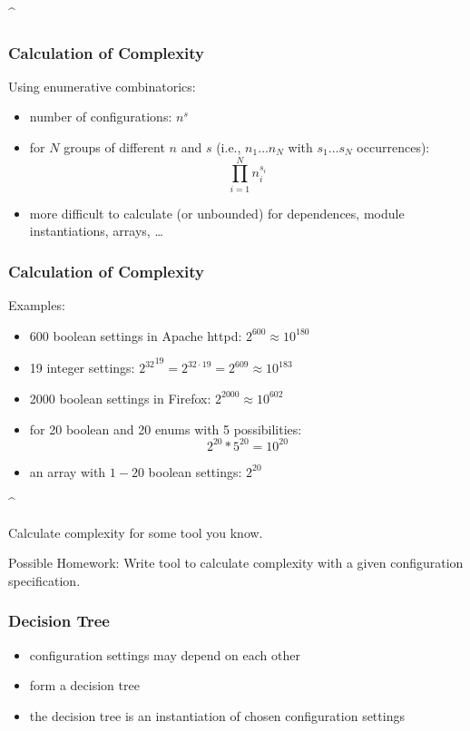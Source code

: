 \lstDeleteShortInline^
\begin{frame}
	\frametitle{Calculation of Complexity}

	Using enumerative combinatorics:
	\begin{itemize}
	\item number of configurations: $n^s$
	\item for $N$ groups of different $n$ and $s$ (i.e., $n_1 \dots n_N$ with $s_1 \dots s_N$ occurrences):  $$\prod_{i=1}^{N} n_i^{s_i}$$
	\item more difficult to calculate (or unbounded) for dependences, module instantiations, arrays, \dots
	\end{itemize}
\end{frame}

\begin{frame}
	\frametitle{Calculation of Complexity}

	Examples:
	\begin{itemize}
	\item 600 boolean settings in Apache httpd:
	\pause
	$2^{600} \approx 10^{180}$

	\item 19 integer settings:
	\pause
	${2^{32}}^{19} = 2^{32 \cdot 19} = 2^{609} \approx 10^{183}$

	\item 2000 boolean settings in Firefox:
	\pause
	$2^{2000} \approx 10^{602}$

	\item for 20 boolean and 20 enums with 5 possibilities:
	\pause
	$$2^{20}*5^{20} = 10^{20}$$

	\item an array with $1-20$ boolean settings:
	\pause
	$2^{20}$
	\end{itemize}
\end{frame}
\lstMakeShortInline[postbreak=,keywordstyle={}]^

\begin{assignment}
	\begin{task}
	Calculate complexity for some tool you know.
	\end{task}

	\begin{task}
	Possible Homework: Write tool to calculate complexity with a given configuration specification.
	\end{task}
\end{assignment}

\begin{frame}
	\frametitle{Decision Tree}
	\begin{itemize}
	\item configuration settings may depend on each other
	\item form a decision tree~\cite{reiser2009cvm,czarnecki2012cool}
	\item the decision tree is an instantiation of chosen configuration settings
	\end{itemize}
\end{frame}

